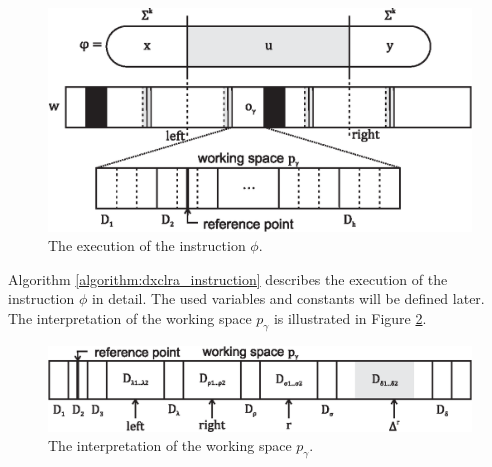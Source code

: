 \begin{figure}[htp]
\centering
\includegraphics[scale=1.0]{img/instruction_and_tape.eps}
\caption[The execution of the instruction $\phi$.]
{The execution of the instruction $\phi$.}
\label{figure:instruction_and_tape}
\end{figure}

Algorithm \ref{algorithm:dxclra_instruction} describes the execution of the instruction $\phi$ in detail. The used variables and constants will be defined later. The interpretation of the working space $p_{\gamma}$ is illustrated in Figure \ref{figure:working_space_detail}.

\begin{figure}[htp]
\centering
\includegraphics[scale=1.0]{img/working_space_detail.eps}
\caption[The interpretation of the working space $p_{\gamma}$.]
{The interpretation of the working space $p_{\gamma}$.}
\label{figure:working_space_detail}
\end{figure}


